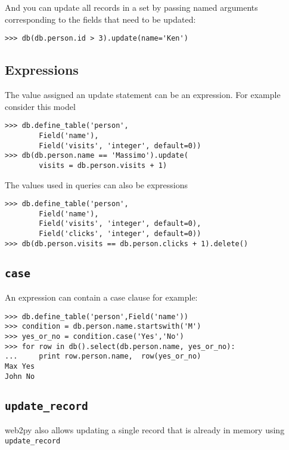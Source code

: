 \documentclass[justified,sixbynine,notoc]{tufte-book}
\def\ft{\small\tt}
\def\inxx#1{\index{#1}}
\begin{document}
\begin{fullwidth}
And you can update all records in a set by passing named arguments corresponding to the fields that need to be updated:

\inxx{update}
\begin{lstlisting}
>>> db(db.person.id > 3).update(name='Ken')
\end{lstlisting}

\goodbreak\subsection{Expressions}

The value assigned an update statement can be an expression. For example consider this model
\begin{lstlisting}
>>> db.define_table('person',
        Field('name'),
        Field('visits', 'integer', default=0))
>>> db(db.person.name == 'Massimo').update(
        visits = db.person.visits + 1)
\end{lstlisting}

The values used in queries can also be expressions
\begin{lstlisting}
>>> db.define_table('person',
        Field('name'),
        Field('visits', 'integer', default=0),
        Field('clicks', 'integer', default=0))
>>> db(db.person.visits == db.person.clicks + 1).delete()
\end{lstlisting}

\goodbreak\subsection{{\ft case} \inxx{case}}

An expression can contain a case clause for example:

\begin{lstlisting}
>>> db.define_table('person',Field('name'))
>>> condition = db.person.name.startswith('M')
>>> yes_or_no = condition.case('Yes','No')
>>> for row in db().select(db.person.name, yes_or_no):
...     print row.person.name,  row(yes_or_no)
Max Yes
John No
\end{lstlisting}

\goodbreak\subsection{{\ft update\_record}}

\inxx{update\_record}
web2py also allows updating a single record that is already in memory using {\ft update\_record}


\end{fullwidth}
\end{document}
